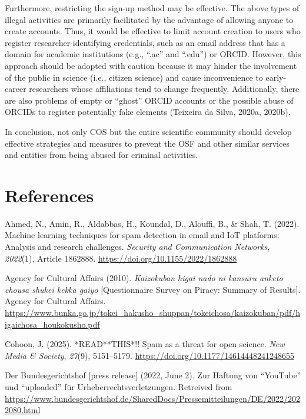 \documentclass[authordate, meta, issue]{jote-new-article}
\begin{document}
	Furthermore, restricting the sign-up method may be effective. The above types of illegal activities are primarily facilitated by the advantage of allowing anyone to create accounts. Thus, it would be effective to limit account creation to users who register researcher-identifying credentials, such as an email address that has a domain for academic institutions (e.g., “.ac” and “.edu”) or ORCID. However, this approach should be adopted with caution because it may hinder the involvement of the public in science (i.e., citizen science) and cause inconvenience to early-career researchers whose affiliations tend to change frequently. Additionally, there are also problems of empty or “ghost” ORCID accounts or the possible abuse of ORCIDs to register potentially fake elements (Teixeira da Silva, 2020a, 2020b).



	In conclusion, not only COS but the entire scientific community should develop effective strategies and measures to prevent the OSF and other similar services and entities from being abused for criminal activities.







	\section{References}



	Ahmed, N., Amin, R., Aldabbas, H., Koundal, D., Alouffi, B., \& Shah, T. (2022). Machine learning techniques for spam detection in email and IoT platforms: Analysis and research challenges. \emph{Security and Communication Networks}, \emph{2022}(1), Article 1862888. \url{https://doi.org/10.1155/2022/1862888}



	Agency for Cultural Affairs (2010). \emph{Kaizokuban higai nado ni kansuru anketo chousa shukei kekka gaiyo} [Questionnaire Survey on Piracy: Summary of Results]. Agency for Cultural Affairs. \url{https://www.bunka.go.jp/tokei\_hakusho\_shuppan/tokeichosa/kaizokuban/pdf/higaichosa\_houkokusho.pdf}



	Cohoon, J. (2025). *READ**THIS*!! Spam as a threat for open science. \emph{New Media \& Society}, \emph{27}(9), 5151--5179. \url{https://doi.org/10.1177/14614448241248655}



	Der Bundesgerichtshof [press release] (2022, June 2). Zur Haftung von “YouTube” und “uploaded” für Urheberrechtsverletzungen. Retreived from \url{https://www.bundesgerichtshof.de/SharedDocs/Pressemitteilungen/DE/2022/2022080.html}
\end{document}
